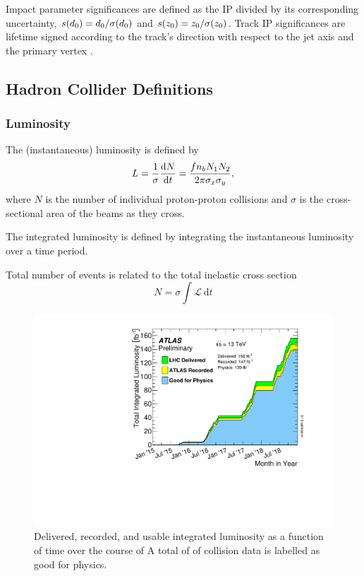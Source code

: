 Impact parameter significances are defined as the IP divided by its corresponding uncertainty, $s(d_0) = d_0 / \sigma(d_0)$ and $s(z_0) = z_0 / \sigma(z_0)$.
Track IP significances are lifetime signed according to the track's direction with respect to the jet axis and the primary vertex \cite{PERF-2012-04}.


\subsection{Hadron Collider Definitions}\label{sec:collider_defs}

\subsubsection{Luminosity}
The (instantaneous) luminosity is defined by
%
\begin{equation}\label{eq:lumi_def}
L = \frac{1}{\sigma} \frac{\mathrm{d}N}{\mathrm{d}t} = \frac{f n_b N_1 N_2}{2 \pi \sigma_x \sigma_y},
\end{equation}
%
where $N$ is the number of individual proton-proton collisions and $\sigma$ is the cross-sectional area of the beams as they cross.

The integrated luminosity is defined by integrating the instantaneous luminosity over a time period.

Total number of events is related to the total inelastic cross section
%
\begin{equation}
 N = \sigma \int \mathcal{L} ~\mathrm{d}t 
\end{equation}
%

%
\begin{figure}[!htbp]
  \centering
  \includegraphics[width=0.6\linewidth]{chapters/2.detector/figs/intlumivstimeRun2DQall.pdf}
  \caption{
    Delivered, recorded, and usable integrated luminosity as a function of time over the course of \runtwo \cite{atlas-lumi-run2}
    A total of \intlumi of collision data is labelled as good for physics.
  }
  \label{fig:run2_lumi}
\end{figure}
%


